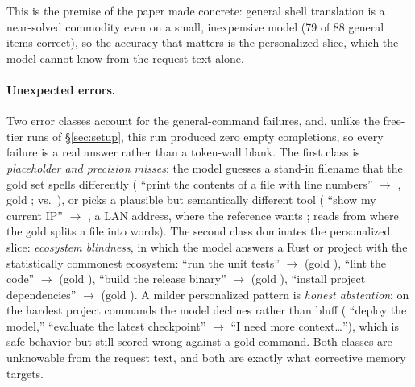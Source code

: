 \noindent This is the premise of the paper made concrete: general shell translation is a
near-solved commodity even on a small, inexpensive model (79 of 88 general items
correct), so the accuracy that matters is the personalized slice, which the model cannot
know from the request text alone.

\paragraph{Unexpected errors.}
Two error classes account for the general-command failures, and, unlike the free-tier
runs of \S\ref{sec:setup}, this run produced zero empty completions, so every failure
is a real answer rather than a token-wall blank. The first class is \emph{placeholder and
precision misses}: the model guesses a stand-in filename that the gold set spells
differently ( ``print the contents of a file with line numbers''
$\rightarrow$ , gold ; 
 vs.\ ), or picks a plausible but
semantically different tool ( ``show my current IP'' $\rightarrow$
, a LAN address, where the reference wants ;
 reads from  where the gold splits a file into words). The
second class dominates the personalized slice: \emph{ecosystem blindness}, in which the
model answers a Rust or  project with the statistically commonest ecosystem:
 ``run the unit tests'' $\rightarrow$  (gold ),
 ``lint the code'' $\rightarrow$  (gold ),
 ``build the release binary'' $\rightarrow$  (gold
),  ``install project dependencies'' $\rightarrow$
 (gold ). A milder personalized pattern is \emph{honest
abstention}: on the hardest project commands the model declines rather than bluff
( ``deploy the model,''  ``evaluate the latest checkpoint''
$\rightarrow$ ``I need more context\dots''), which is safe behavior but still scored
wrong against a gold command. Both classes are unknowable from the request text, and both
are exactly what corrective memory targets.

